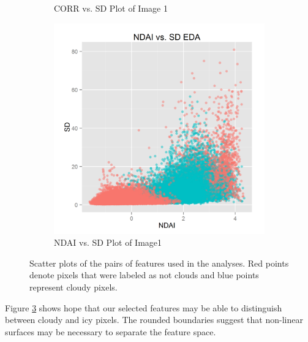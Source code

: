 \documentclass{article}\usepackage[]{graphicx}\usepackage[]{color}
\begin{document}
\begin{figure}[h]
\begin{subfigure}[b]{0.3\textwidth}
    \caption{CORR vs. SD Plot of Image 1}
    \label{CorrSd}
  \end{subfigure}  
  \begin{subfigure}[b]{0.3\textwidth}
    \includegraphics[width=\linewidth]{NDAI_vs_SD.png}
    \caption{NDAI vs. SD Plot of Image1}
    \label{NdaiSd}
  \end{subfigure}
  \caption{Scatter plots of the pairs of features used in the analyses. Red points denote pixels that were labeled as not clouds and blue points represent cloudy pixels.}
  \label{fig:Scatter}
\end{figure}
Figure \ref{fig:Scatter} shows hope that our selected features may be able to distinguish between cloudy and icy pixels.  The rounded boundaries suggest that non-linear surfaces may be necessary to separate the feature space.
\end{document}
